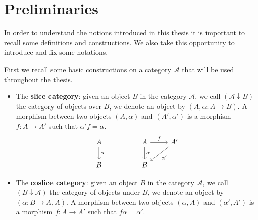 \chapter*{Preliminaries}



\fontsize{12}{14.5}\selectfont

In order to understand the notions introduced in this thesis it is important to recall some definitions and constructions. We also take this opportunity to introduce and fix some notations.

First we recall some basic constructions on a category $\mathcal{A}$ that will be used throughout the thesis.

\begin{itemize}
    \item The \textbf{slice category}: given an object $B$ in the category $\mathcal{A}$, we call $(\mathcal{A} \downarrow B)$ the category of objects over $B$, we denote an object by $(A, \alpha:A \to B)$. A morphism between two objects $(A, \alpha)$ and $(A', \alpha')$ is a morphism $f: A \to A'$ such that $\alpha' f = \alpha$.
    \[
    \begin{tikzcd}
    A \arrow[d, "\alpha"] &  & A \arrow[r, "f"] \arrow[d, "\alpha"] & A' \arrow[ld, "\alpha'"] \\
    B                     &  & B                                    &                         
    \end{tikzcd}
    \]
    \item The \textbf{coslice category}: given an object $B$ in the category $\mathcal{A}$, we call $(B \downarrow \mathcal{A})$ the category of objects under $B$, we denote an object by $(\alpha:B \to A, A)$. A morphism between two objects $(\alpha, A)$ and $(\alpha', A')$ is a morphism $f: A \to A'$ such that $f \alpha = \alpha'$.
    \[
    \begin{tikzcd}

\end{tikzcd}\]
\end{itemize}
